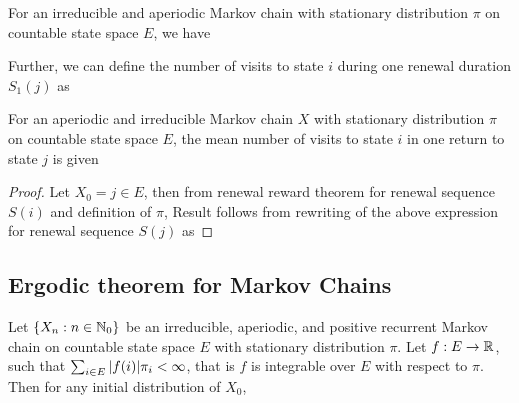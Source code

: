 \documentclass[a4paper,10pt,english]{article}
\begin{document}
\begin{cor} 
For an irreducible and aperiodic Markov chain with stationary distribution $\pi$ on countable state space $E$, we have 
\end{cor}
Further, we can define the number of visits to state $i$ during one renewal duration $S_1(j)$ as 
\begin{prop} 
For an aperiodic and irreducible Markov chain $X$ with stationary distribution $\pi$ on countable state space $E$, 
the mean number of visits to state $i$ in one return to state $j$ is given 
\end{prop}
\begin{proof} 
Let $X_0 = j \in E$, then from renewal reward theorem for renewal sequence $S(i)$ and definition of $\pi$, %
Result follows from rewriting of the above expression for renewal sequence $S(j)$ as 
\end{proof}

\subsection{Ergodic theorem for Markov Chains} 

\begin{prop} Let $\{X_n: n \in \mathbb{N}_0\}$ be an irreducible, aperiodic, and positive recurrent Markov chain on countable state space $E$ with stationary distribution $\pi$. 
Let $f : E \to \mathbb{R}$, such that $\sum_{i \in E} \arrowvert f(i) \arrowvert \pi_i < \infty$, that is $f$ is integrable over $E$ with respect to $\pi$.  
Then for any initial distribution of $X_0$, 
\end{prop}
\end{document}

